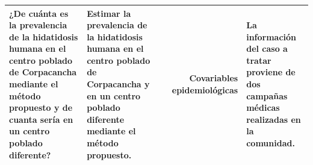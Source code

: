 \begin{landscape}
\begin{table}[htbp]
\begin{tabular}{|p{11.07em}|p{11.07em}|r|r|p{11.07em}|}
    ¿De cuánta es la prevalencia de la hidatidosis humana en el centro poblado de Corpacancha mediante el método propuesto y de cuanta sería en un centro poblado diferente? & Estimar la prevalencia de la hidatidosis humana en el centro poblado de Corpacancha y en un centro poblado diferente mediante el método propuesto. &       &   Covariables epidemiológicas    & La información del caso a tratar proviene de dos campañas médicas realizadas en la comunidad. \\
    \bottomrule
    \end{tabular}
  
\end{table}%

\end{landscape}
